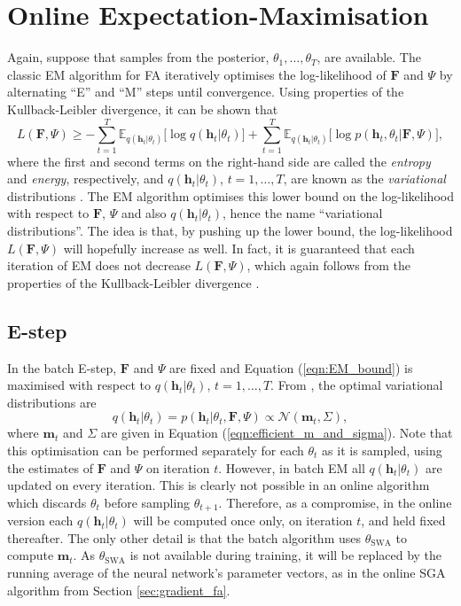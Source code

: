 \documentclass[msc,deptreport.inf]{infthesis} %
\newcommand{\matr}[1]{\mathbf{#1}}
\newcommand{\E}{\mathbb E}
\begin{document}
\section{Online Expectation-Maximisation}\label{sec:online_em}

Again, suppose that samples from the posterior, $\theta_1,\dots,\theta_T$, are available. The classic EM algorithm for FA iteratively optimises the log-likelihood of $\matr{F}$ and $\Psi$ by alternating ``E'' and ``M'' steps until convergence. Using properties of the Kullback-Leibler divergence, it can be shown that 
\begin{equation}\label{eqn:EM_bound}
	L(\matr{F}, \Psi) \geq 
	- \sum_{t=1}^T \E_{q(\matr{h}_t | \theta_t)} \big[\log q(\matr{h}_t | \theta_t)\big]
	+ \sum_{t=1}^T \E_{q(\matr{h}_t | \theta_t)} \big[\log p(\matr{h}_t, \theta_t | \matr{F}, \Psi)\big],
\end{equation}
where the first and second terms on the right-hand side are called the \emph{entropy} and \emph{energy}, respectively, and $q(\matr{h}_t | \theta_t)$, $t=1,\dots,T$, are known as the \emph{variational} distributions \cite{barber2007}. The EM algorithm optimises this lower bound on the log-likelihood with respect to $\matr{F}$, $\Psi$ and also $q(\matr{h}_t | \theta_t)$, hence the name ``variational distributions''. The idea is that, by pushing up the lower bound, the log-likelihood $L(\matr{F}, \Psi)$ will hopefully increase as well. In fact, it is guaranteed that each iteration of EM does not decrease $L(\matr{F}, \Psi)$, which again follows from the properties of the Kullback-Leibler divergence \cite{barber2007}.

\subsection{E-step}

In the batch E-step, $\matr{F}$ and $\Psi$ are fixed and Equation (\ref{eqn:EM_bound}) is maximised with respect to $q(\matr{h}_t | \theta_t)$, $t=1,\dots,T$. From \cite{barber2007}, the optimal variational distributions are 
\begin{equation}
	q(\matr{h}_t | \theta_t) = p(\matr{h}_t | \theta_t, \matr{F}, \Psi)  \propto \mathcal{N}(\matr{m}_t, \Sigma), 
\end{equation}
where $\matr{m}_t$ and $\Sigma$ are given in Equation (\ref{eqn:efficient_m_and_sigma}). Note that this optimisation can be performed separately for each $\theta_t$ as it is sampled, using the estimates of $\matr{F}$ and $\Psi$ on iteration $t$. However, in batch EM all $q(\matr{h}_t | \theta_t)$ are updated on every iteration. This is clearly not possible in an online algorithm which discards $\theta_t$ before sampling $\theta_{t + 1}$. Therefore, as a compromise, in the online version each $q(\matr{h}_t | \theta_t)$ will be computed once only, on iteration $t$, and held fixed thereafter. The only other detail is that the batch algorithm uses $\theta_{\text{SWA}}$ to compute $\matr{m}_t$. As $\theta_{\text{SWA}}$ is not available during training, it will be replaced by the running average of the neural network's parameter vectors, as in the online SGA algorithm from Section \ref{sec:gradient_fa}.
\end{document}
